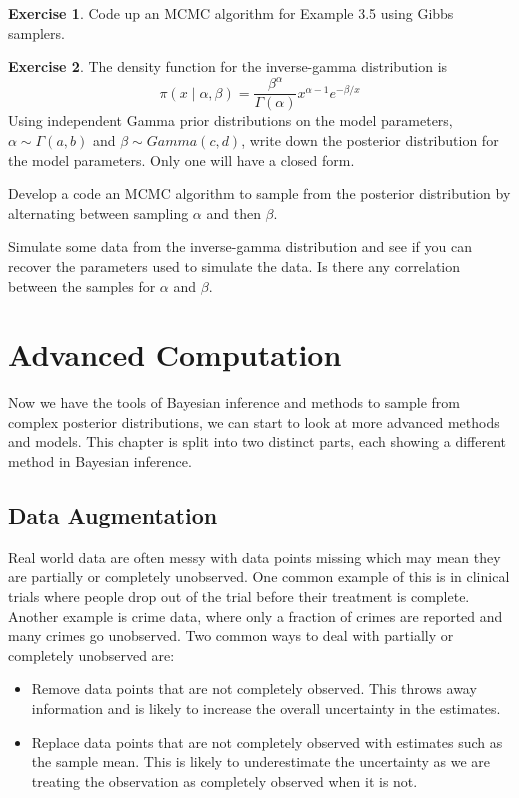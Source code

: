 \documentclass[
]{book}
\providecommand{\tightlist}{%
  \setlength{\itemsep}{0pt}\setlength{\parskip}{0pt}}
\theoremstyle{definition}
\theoremstyle{definition}
\theoremstyle{definition}
\newtheorem{exercise}{Exercise}[chapter]
\theoremstyle{definition}
\theoremstyle{remark}
\begin{document}
\begin{exercise}
Code up an MCMC algorithm for Example 3.5 using Gibbs samplers.
\end{exercise}

\begin{exercise}
The density function for the inverse-gamma distribution is
\[
\pi(x\mid \alpha, \beta) = \frac{\beta^\alpha}{\Gamma(\alpha)}x^{\alpha - 1}e^{-\beta/x}
\]
Using independent Gamma prior distributions on the model parameters, \(\alpha \sim \Gamma(a, b)\) and \(\beta \sim Gamma(c, d)\), write down the posterior distribution for the model parameters. Only one will have a closed form.

Develop a code an MCMC algorithm to sample from the posterior distribution by alternating between sampling \(\alpha\) and then \(\beta\).

Simulate some data from the inverse-gamma distribution and see if you can recover the parameters used to simulate the data. Is there any correlation between the samples for \(\alpha\) and \(\beta\).
\end{exercise}

\hypertarget{advanced-computation}{%
\chapter{Advanced Computation}\label{advanced-computation}}

Now we have the tools of Bayesian inference and methods to sample from complex posterior distributions, we can start to look at more advanced methods and models. This chapter is split into two distinct parts, each showing a different method in Bayesian inference.

\hypertarget{data-augmentation}{%
\section{Data Augmentation}\label{data-augmentation}}

Real world data are often messy with data points missing which may mean they are partially or completely unobserved. One common example of this is in clinical trials where people drop out of the trial before their treatment is complete. Another example is crime data, where only a fraction of crimes are reported and many crimes go unobserved. Two common ways to deal with partially or completely unobserved are:

\begin{itemize}
\tightlist
\item
  Remove data points that are not completely observed. This throws away information and is likely to increase the overall uncertainty in the estimates.
\item
  Replace data points that are not completely observed with estimates such as the sample mean. This is likely to underestimate the uncertainty as we are treating the observation as completely observed when it is not.
\end{itemize}
\end{document}
